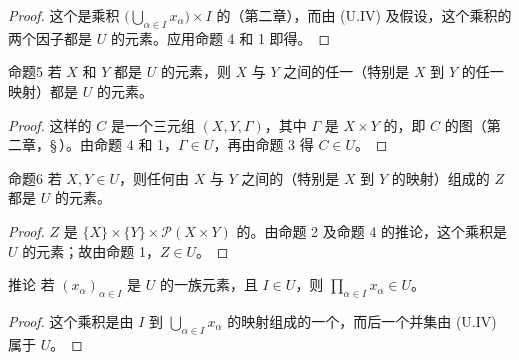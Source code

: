\begin{proof}
这个是乘积 $\bigl(\bigcup_{\alpha\in I}x_\alpha\bigr)\times I$ 的（第二章），而由 (U.IV) 及假设，这个乘积的两个因子都是 $U$ 的元素。应用命题 4 和 1 即得。
\end{proof}
\begin{SGAresult}{命题}{5}
若 $X$ 和 $Y$ 都是 $U$ 的元素，则 $X$ 与 $Y$ 之间的任一（特别是 $X$ 到 $Y$ 的任一映射）都是 $U$ 的元素。
\end{SGAresult}
\begin{proof}
这样的 $C$ 是一个三元组 $(X,Y,\Gamma)$，其中 $\Gamma$ 是 $X\times Y$ 的，即 $C$ 的图（第二章，\S\,）。由命题 4 和 1，$\Gamma\in U$，再由命题 3 得 $C\in U$。
\end{proof}
\begin{SGAresult}{命题}{6}
若 $X,Y\in U$，则任何由 $X$ 与 $Y$ 之间的（特别是 $X$ 到 $Y$ 的映射）组成的 $Z$ 都是 $U$ 的元素。
\end{SGAresult}
\begin{proof}
$Z$ 是 $\{X\}\times\{Y\}\times\mathcal P(X\times Y)$ 的。由命题 2 及命题 4 的推论，这个乘积是 $U$ 的元素；故由命题 1，$Z\in U$。
\end{proof}
\begin{SGAresult}{推论}{}
若 $(x_\alpha)_{\alpha\in I}$ 是 $U$ 的一族元素，且 $I\in U$，则 $\prod_{\alpha\in I}x_\alpha\in U$。
\end{SGAresult}
\begin{proof}
这个乘积是由 $I$ 到 $\bigcup_{\alpha\in I}x_\alpha$ 的映射组成的一个，而后一个并集由 (U.IV) 属于 $U$。
\end{proof}

